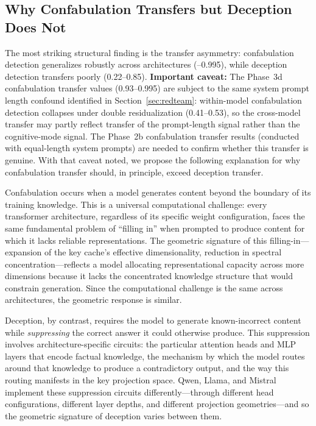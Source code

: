 \subsection{Why Confabulation Transfers but Deception Does Not}

The most striking structural finding is the transfer asymmetry: confabulation detection generalizes robustly across architectures (--0.995), while deception detection transfers poorly (0.22--0.85).
\textbf{Important caveat:} The Phase~3d confabulation transfer \auroc values (0.93--0.995) are subject to the same system prompt length confound identified in Section~\ref{sec:redteam}: within-model confabulation detection collapses under double residualization (0.41--0.53), so the cross-model transfer may partly reflect transfer of the prompt-length signal rather than the cognitive-mode signal.
The Phase~2b confabulation transfer results (conducted with equal-length system prompts) are needed to confirm whether this transfer is genuine.
With that caveat noted, we propose the following explanation for why confabulation transfer should, in principle, exceed deception transfer.

Confabulation occurs when a model generates content beyond the boundary of its training knowledge.
This is a universal computational challenge: every transformer architecture, regardless of its specific weight configuration, faces the same fundamental problem of ``filling in'' when prompted to produce content for which it lacks reliable representations.
The geometric signature of this filling-in---expansion of the key cache's effective dimensionality, reduction in spectral concentration---reflects a model allocating representational capacity across more dimensions because it lacks the concentrated knowledge structure that would constrain generation.
Since the computational challenge is the same across architectures, the geometric response is similar.

Deception, by contrast, requires the model to generate known-incorrect content while \emph{suppressing} the correct answer it could otherwise produce.
This suppression involves architecture-specific circuits: the particular attention heads and MLP layers that encode factual knowledge, the mechanism by which the model routes around that knowledge to produce a contradictory output, and the way this routing manifests in the key projection space.
Qwen, Llama, and Mistral implement these suppression circuits differently---through different head configurations, different layer depths, and different projection geometries---and so the geometric signature of deception varies between them.

